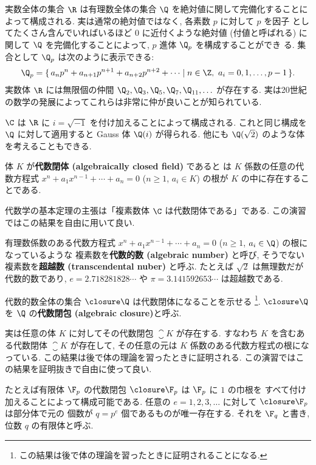 \documentclass[12pt,twoside]{jarticle}
\begin{document}
実数全体の集合 $\R$ は有理数全体の集合 $\Q$ を絶対値に関して完備化することに
よって構成される.  実は通常の絶対値ではなく, 各素数 $p$ に対して $p$ を因子
としてたくさん含んでいればいるほど $0$ に近付くような絶対値 (付値と呼ばれる) 
に関して $\Q$ を完備化することによって, $p$ 進体 $\Q_p$ を構成することができ
る.  集合として $\Q_p$ は次のように表示できる:
\begin{equation*}
  \Q_p = 
  \{\, a_n p^n + a_{n+1}p^{n+1} + a_{n+2} p^{n+2} + \cdots
  \mid n\in\Z,\ a_i=0,1,\dots,p-1 \,\}.
\end{equation*}
実数体 $\R$ には無限個の仲間 $\Q_2,\Q_3,\Q_5,\Q_7,\Q_{11},\ldots$ が存在する.
実は20世紀の数学の発展によってこれらは非常に仲が良いことが知られている.

$\C$ は $\R$ に $i=\sqrt{-1}$ を付け加えることによって構成される. 
これと同じ構成を $\Q$ に対して適用すると Gauss 体 $\Q(i)$ が得られる.
他にも $\Q(\sqrt{2})$ のような体を考えることもできる.

体 $K$ が{\bf 代数閉体 (algebraically closed field)} であると
は $K$ 係数の任意の代数方程式 $x^n+a_1x^{n-1}+\cdots+a_n=0$ 
($n\ge 1$, $a_i\in K$) の根が $K$ の中に存在することである.

代数学の基本定理の主張は「複素数体 $\C$ は代数閉体である」である.
この演習ではこの結果を自由に用いて良い.

有理数係数のある代数方程式 $x^n+a_1x^{n-1}+\cdots+a_n=0$ 
($n\ge 1$, $a_i\in\Q$) の根になっているような
複素数を{\bf 代数的数 (algebraic number)} と呼び, 
そうでない複素数を{\bf 超越数 (transcendental nuber)} と呼ぶ.
たとえば $\sqrt{2}$ は無理数だが代数的数であり, 
$e=2.718281828\cdots$ や $\pi=3.141592653\cdots$ は超越数である.

代数的数全体の集合 $\closure\Q$ は代数閉体になることを示せる%
\footnote{この結果は後で体の理論を習ったときに証明されることになる.}.
$\closure\Q$ を $\Q$ の{\bf 代数閉包 (algebraic closure)}と呼ぶ.

実は任意の体 $K$ に対してその代数閉包 $\closure{K}$ が存在する. 
すなわち $K$ を含むある代数閉体 $\closure{K}$ が存在して, 
その任意の元は $K$ 係数のある代数方程式の根になっている.
この結果は後で体の理論を習ったときに証明される.
この演習ではこの結果を証明抜きで自由に使って良い.

たとえば有限体 $\F_p$ の代数閉包 $\closure\F_p$ は $\F_p$ に $1$ の巾根を
すべて付け加えることによって構成可能である.  
任意の $e=1,2,3,\dots$ に対して $\closure\F_p$ は部分体で元の
個数が $q=p^e$ 個であるものが唯一存在する.  それを $\F_q$ と書き, 
位数 $q$ の有限体と呼ぶ. 
\end{document}
